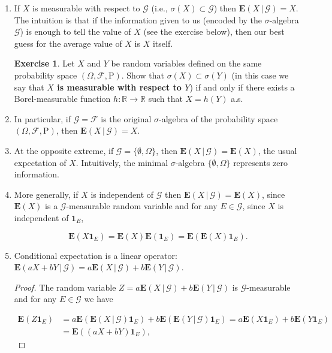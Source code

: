 \documentclass[11pt]{report}
\newcommand{\R}{\mathbb{R}}
\theoremstyle{plain}
\theoremstyle{definition}
\newtheorem{xexercise}[thm]{Exercise}
\begin{document}
\begin{enumerate}[label=\arabic*.]
\item If $X$ is measurable with respect to $\mathcal{G}$ (i.e., $\sigma(X) \subset \mathcal{G}$) then $\mathbf{E}\left(X\,|\,\mathcal{G}\right) = X$. The intuition is that if the information given to us (encoded by the $\sigma$-algebra $\mathcal{G}$) is enough to tell the value of $X$ (see the exercise below), then our best guess for the average value of $X$ is $X$ itself.

\begin{xexercise}
Let $X$ and $Y$ be random variables defined on the same probability space $(\Omega, \mathcal{F}, \mathrm{P})$. Show that $\sigma(X) \subset \sigma(Y)$ (in this case we say that \textbf{$X$ is measurable with respect to $Y$}) if and only if there exists a Borel-measurable function $h:\R\to\R$ such that $X=h(Y)$ a.s.
\end{xexercise}
\item In particular, if $\mathcal{G}=\mathcal{F}$ is the original $\sigma$-algebra of the probability space $(\Omega, \mathcal{F}, \mathrm{P})$, then $\mathbf{E}\left(X\,|\,\mathcal{G}\right) = X$.
\item At the opposite extreme, if $\mathcal{G}= \{ \emptyset, \Omega \}$, then $\mathbf{E}\left(X\,|\,\mathcal{G}\right) = \mathbf{E}(X)$, the usual expectation of $X$. Intuitively, the minimal $\sigma$-algebra $\{\emptyset, \Omega\}$ represents zero information.
\item More generally, if $X$ is independent of $\mathcal{G}$ then $\mathbf{E}\left(X\,|\,\mathcal{G}\right)=\mathbf{E}(X)$, since $\mathbf{E}(X)$ is a $\mathcal{G}$-measurable random variable and for any $E\in\mathcal{G}$, since $X$ is independent of $\mathbf{1}_E$,

\[
\mathbf{E}(X\mathbf{1}_E) = \mathbf{E}(X)\mathbf{E}(\mathbf{1}_E) = \mathbf{E}(\mathbf{E}(X)\mathbf{1}_E).
\]
\item Conditional expectation is a linear operator: $\mathbf{E}\left(aX+bY\,|\,\mathcal{G}\right) = a \mathbf{E}\left(X\,|\,\mathcal{G}\right) + b \mathbf{E}\left(Y\,|\,\mathcal{G}\right).$

\begin{proof}
The random variable $Z=a \mathbf{E}\left(X\,|\,\mathcal{G}\right) + b \mathbf{E}\left(Y\,|\,\mathcal{G}\right)$ is $\mathcal{G}$-measurable and for any $E\in\mathcal{G}$ we have

\begin{align*} \mathbf{E}(Z\mathbf{1}_E) &= a\mathbf{E}(\mathbf{E}\left(X\,|\,\mathcal{G}\right)\mathbf{1}_E)+b\mathbf{E}(\mathbf{E}\left(Y\,|\,\mathcal{G}\right)\mathbf{1}_E) =
a \mathbf{E}(X\mathbf{1}_E)+b\mathbf{E}(Y\mathbf{1}_E) \\&=\mathbf{E}((aX+bY)\mathbf{1}_E),
\end{align*}


\end{proof}
\end{enumerate}
\end{document}
